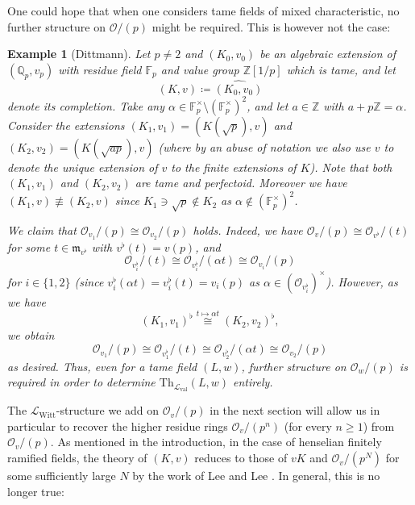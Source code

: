 \documentclass[a4paper]{amsart}
\theoremstyle{mystyle2}
\theoremstyle{mystyle}
\newtheorem{examp}[thm]{Example}
\renewcommand{\L}{\mathcal{L}}
\newcommand{\Lval}{\L_{\mathrm{val}}}
\newcommand{\LWitt}{\L_{\mathrm{Witt}}}
\renewcommand{\O}{\mathcal{O}}
\numberwithin{equation}{section}
\begin{document}
    One could hope that when one considers tame fields of mixed characteristic,
    no further structure on $\O/(p)$ might be required. This is however not the case:
    \begin{examp}[Dittmann] \label{ex:tame}
        Let $p\neq 2$ and $(K_0,v_0)$ be an algebraic 
        extension of \((\mathbb{Q}_p,v_p)\) with residue field
        $\mathbb{F}_p$ and value group $\mathbb{Z}[1/p]$ which is tame, and let $$(K,v) \coloneqq \widehat{(K_0,v_0)}$$ denote its completion. 
        Take any $\alpha \in \mathbb{F}_p^\times\setminus (\mathbb{F}_p^\times)^2$,
        and let $a \in \mathbb{Z}$ with $a + p\mathbb{Z} = \alpha$.
        Consider the extensions $(K_1,v_1)=(K(\sqrt{p}),v)$ and 
        $(K_2,v_2)=(K(\sqrt{ap}),v)$ (where by an abuse of notation we also use $v$ to denote the unique extension of $v$ to the finite extensions of $K$). 
        Note that both
        $(K_1,v_1)$ and $(K_2,v_2)$ are tame and perfectoid.
        Moreover we have $(K_1,v) \not\equiv (K_2,v)$ since $K_1 \ni \sqrt{p} \notin K_2$
        as $\alpha \notin (\mathbb{F}_p^\times)^2$.

        We claim that $\mathcal{O}_{v_1}/(p) \cong \mathcal{O}_{v_2}/(p)$ holds.
        Indeed, we have $\mathcal{O}_v/(p) \cong \mathcal{O}_{v^\flat}/(t)$
        for some $t \in \mathfrak{m}_{v^\flat}$ with $v^\flat(t)=v(p)$,
        and $$\mathcal{O}_{v_i^\flat}/(t) \cong \mathcal{O}_{v_i^\flat}/(\alpha t) \cong \mathcal{O}_{v_i}/(p)$$
        for $i \in \{1,2\}$ (since $v_i^\flat(\alpha t)=v_i^\flat(t)=v_i(p)$ as $\alpha \in ({\O_{v_i^\flat}})^\times$). However, as we have 
        $$
        (K_1,v_1)^\flat \overset{t \mapsto \alpha t}{\cong} (K_2,v_2)^\flat,
        $$
        we obtain 
        $$
        \mathcal{O}_{v_1}/(p) \cong \mathcal{O}_{v_1^\flat}/(t) \cong \mathcal{O}_{v_2^\flat}/(\alpha t) \cong \mathcal{O}_{v_2}/(p)
        $$
        as desired. Thus, even for a tame field $(L,w)$, further structure on 
        $\mathcal{O}_w/(p)$
        is required in order to determine $\mathrm{Th}_{\Lval}(L,w)$ entirely.
    \end{examp}

    The $\LWitt$-structure we add on $\O_v/(p)$ in the next section will allow us in particular to recover the higher residue rings
    $\O_v/(p^n)$ (for every $n \geq 1$) from $\O_v/(p)$. As mentioned in the introduction, in the
    case of henselian finitely ramified fields, the theory of $(K,v)$ reduces to those of
    $vK$ and $\O_v/(p^N)$ for some sufficiently large $N$ by the work of Lee and Lee \cite{LeeLee}. In general, this is no longer true:
\end{document}
